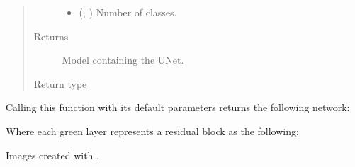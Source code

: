 \documentclass[letterpaper,10pt,english]{sphinxmanual}
\begin{document}
\begin{fulllineitems}
\begin{quote}
\begin{description}
\begin{itemize}
\item {} 
 (, ) \textendash{} Number of classes.

\end{itemize}

\item[{Returns}] \leavevmode
{} \textendash{} Model containing the U\sphinxhyphen{}Net.

\item[{Return type}] \leavevmode
{}

\end{description}\end{quote}

Calling this function with its default parameters returns the following network:


Where each green layer represents a residual block as the following:


Images created with .

\end{fulllineitems}

\end{document}
